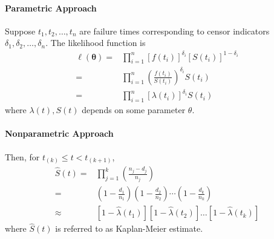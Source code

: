 \paragraph*{Parametric Approach}

Suppose $t_{1},t_{2},\ldots,t_{n}$ are failure times corresponding to censor indicators $\delta_{1},\delta_{2},\ldots,\delta_{n}$. The likelihood function is
\begin{equation}
    \begin{aligned}
        \ell\left(\boldsymbol{\theta}\right)= & \prod_{i=1}^{n}\left[f\left(t_{i}\right)\right]^{\delta_{i}}\left[S\left(t_{i}\right)\right]^{1-\delta_{i}} \\
        =                                     & \prod_{i=1}^{n}\left(\frac{f\left(t_{i}\right)}{S\left(t_{i}\right)}\right)^{\delta_{i}}S\left(t_{i}\right) \\
        =                                     & \prod_{i=1}^{n}\left[\lambda\left(t_{i}\right)\right]^{\delta_{i}}S\left(t_{i}\right)
    \end{aligned}
\end{equation}
where $\lambda(t),S(t)$ depends on some parameter $\theta$.

\begin{example}

\end{example}

\paragraph*{Nonparametric Approach}

Then, for $t_{(k)}\leq t<t_{(k+1)}$,
\begin{equation}
    \begin{aligned}
        \hat{S}(t)= & \prod_{j=1}^{k}\left(\frac{n_{j}-d_{j}}{n_{j}}\right)                                                                                             \\
        =           & \left(1-\frac{d_{1}}{n_{1}}\right)\left(1-\frac{d_{2}}{n_{2}}\right) \cdots\left(1-\frac{d_{k}}{n_{k}}\right)                                     \\
        \approx     & \left[1-\hat{\lambda}\left(t_{1}\right)\right]\left[1-\hat{\lambda}\left(t_{2}\right)\right] \ldots\left[1-\hat{\lambda}\left(t_{k}\right)\right]
    \end{aligned}
\end{equation}
where $\hat{S}(t)$ is referred to as Kaplan-Meier estimate.


